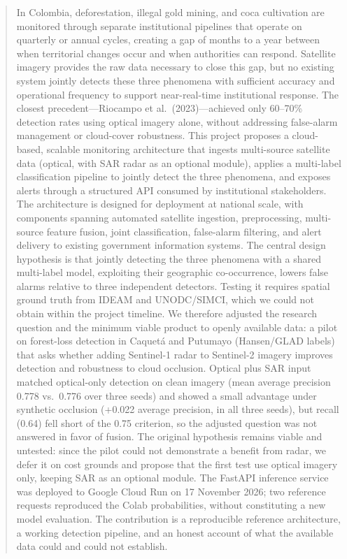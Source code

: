 \documentclass{article}
\begin{document}
\begin{abstract}
In Colombia, deforestation, illegal gold mining, and coca cultivation are monitored
through separate institutional pipelines that operate on quarterly or annual cycles,
creating a gap of months to a year between when territorial changes occur and when
authorities can respond.
Satellite imagery provides the raw data necessary to close this gap, but no existing
system jointly detects these three phenomena with sufficient accuracy and operational
frequency to support near-real-time institutional response.
The closest precedent---Riocampo et al.\ (2023)---achieved only 60--70\% detection
rates using optical imagery alone, without addressing false-alarm management or
cloud-cover robustness.
This project proposes a cloud-based, scalable monitoring architecture that ingests
multi-source satellite data (optical, with SAR radar as an optional module), applies a multi-label
classification pipeline to jointly detect the three phenomena, and exposes alerts
through a structured API consumed by institutional stakeholders.
The architecture is designed for deployment at national scale, with components
spanning automated satellite ingestion, preprocessing, multi-source feature fusion,
joint classification, false-alarm filtering, and alert delivery to existing
government information systems.
The central design hypothesis is that jointly detecting the three phenomena with
a shared multi-label model, exploiting their geographic co-occurrence, lowers
false alarms relative to three independent detectors.
Testing it requires spatial ground truth from IDEAM and UNODC/SIMCI, which we
could not obtain within the project timeline.
We therefore adjusted the research question and the minimum viable product to
openly available data: a pilot on forest-loss detection in Caquetá and Putumayo
(Hansen/GLAD labels) that asks whether adding Sentinel-1 radar to Sentinel-2
imagery improves detection and robustness to cloud occlusion.
Optical plus SAR input matched optical-only detection on clean imagery (mean
average precision 0.778 vs.\ 0.776 over three seeds) and showed a small
advantage under synthetic occlusion (+0.022 average precision, in all three
seeds), but recall (0.64) fell short of the 0.75 criterion, so the adjusted
question was not answered in favor of fusion.
The original hypothesis remains viable and untested: since the pilot could not
demonstrate a benefit from radar, we defer it on cost grounds and propose that
the first test use optical imagery only, keeping SAR as an optional module.
The FastAPI inference service was deployed to Google Cloud Run on 17 November 2026; two reference requests reproduced the Colab probabilities, without constituting a new model evaluation.
The contribution is a reproducible reference architecture, a working
detection pipeline, and an honest account of what the available data could and
could not establish.
\end{abstract}
\end{document}
